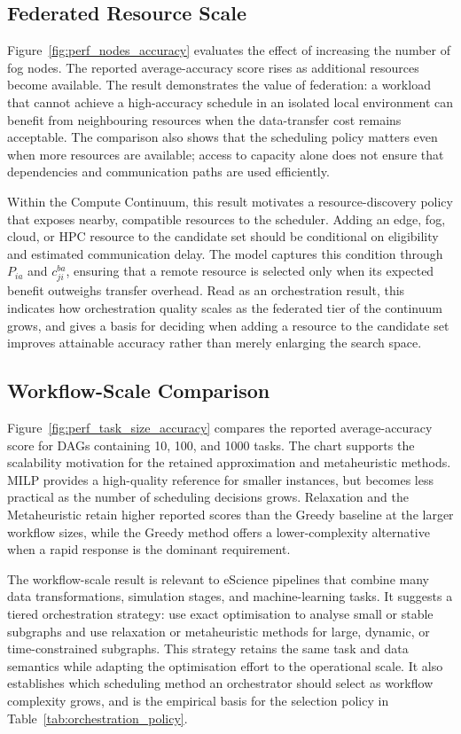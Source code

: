 \subsection{Federated Resource Scale}

Figure~\ref{fig:perf_nodes_accuracy} evaluates the effect of increasing the number of fog nodes. The reported average-accuracy score rises as additional resources become available. The result demonstrates the value of federation: a workload that cannot achieve a high-accuracy schedule in an isolated local environment can benefit from neighbouring resources when the data-transfer cost remains acceptable. The comparison also shows that the scheduling policy matters even when more resources are available; access to capacity alone does not ensure that dependencies and communication paths are used efficiently.


Within the Compute Continuum, this result motivates a resource-discovery policy that exposes nearby, compatible resources to the scheduler. Adding an edge, fog, cloud, or HPC resource to the candidate set should be conditional on eligibility and estimated communication delay. The model captures this condition through $P_{ia}$ and $c_{ji}^{ba}$, ensuring that a remote resource is selected only when its expected benefit outweighs transfer overhead. Read as an orchestration result, this indicates how orchestration quality scales as the federated tier of the continuum grows, and gives a basis for deciding when adding a resource to the candidate set improves attainable accuracy rather than merely enlarging the search space.

\subsection{Workflow-Scale Comparison}

Figure~\ref{fig:perf_task_size_accuracy} compares the reported average-accuracy score for DAGs containing 10, 100, and 1000 tasks. The chart supports the scalability motivation for the retained approximation and metaheuristic methods. MILP provides a high-quality reference for smaller instances, but becomes less practical as the number of scheduling decisions grows. Relaxation and the Metaheuristic retain higher reported scores than the Greedy baseline at the larger workflow sizes, while the Greedy method offers a lower-complexity alternative when a rapid response is the dominant requirement.


The workflow-scale result is relevant to eScience pipelines that combine many data transformations, simulation stages, and machine-learning tasks. It suggests a tiered orchestration strategy: use exact optimisation to analyse small or stable subgraphs and use relaxation or metaheuristic methods for large, dynamic, or time-constrained subgraphs. This strategy retains the same task and data semantics while adapting the optimisation effort to the operational scale. It also establishes which scheduling method an orchestrator should select as workflow complexity grows, and is the empirical basis for the selection policy in Table~\ref{tab:orchestration_policy}.


